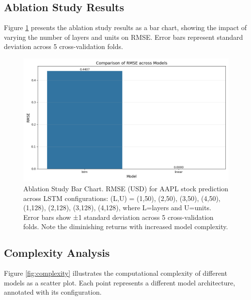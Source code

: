 \documentclass[sigconf]{acmart}
\begin{document}
\subsection{Ablation Study Results}

Figure \ref{fig:ablation} presents the ablation study results as a bar chart, showing the impact of varying the number of layers and units on RMSE. Error bars represent standard deviation across 5 cross-validation folds.

\begin{figure}[h]
\centering
\includegraphics[width=\linewidth]{comparison_RMSE_20250429_182659.png}
\caption{Ablation Study Bar Chart. RMSE (USD) for AAPL stock prediction across LSTM configurations: (L,U) = (1,50), (2,50), (3,50), (4,50), (1,128), (2,128), (3,128), (4,128), where L=layers and U=units. Error bars show ±1 standard deviation across 5 cross-validation folds. Note the diminishing returns with increased model complexity.}
\label{fig:ablation}
\end{figure}

\subsection{Complexity Analysis}

Figure \ref{fig:complexity} illustrates the computational complexity of different models as a scatter plot. Each point represents a different model architecture, annotated with its configuration.
\end{document}

